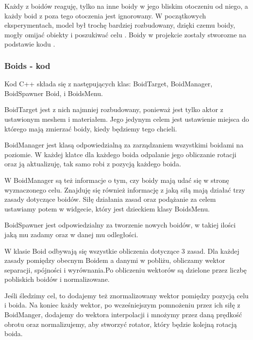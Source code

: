 \documentclass[a4paper,12pt,reqno]{article}
\begin{document}
Każdy z boidów reaguję, tylko na inne boidy w jego bliskim otoczeniu od niego, a każdy boid z poza tego otoczenia jest ignorowany. W początkowych eksperymentach, model był trochę bardziej rozbudowany, dzięki czemu boidy, mogły omijać obiekty i poszukiwać celu \cite{boids_reynolds}. Boidy w projekcie zostały stworozne na podstawie kodu \cite{code_boids}.

\subsubsection{Boids - kod}

Kod C++ składa się z następujących klas: BoidTarget, BoidManager, BoidSpawner Boid,  i BoidsMenu. 

BoidTarget jest z nich najmniej rozbudowany, ponieważ jest tylko aktor z ustawionym meshem i materiałem. Jego jedynym celem jest ustawienie miejsca do którego mają zmierzać boidy, kiedy będziemy tego chcieli.

BoidManager jest klasą odpowiedzialną za zarządzaniem wszystkimi boidami na poziomie. W każdej klatce dla każdego boida odpalanie jego obliczanie rotacji oraz ją aktualizuję, tak samo robi z pozycją każdego boida.



W BoidManager są też informacje o tym, czy boidy mają udać się w stronę wyznaczonego celu. Znajduję się również informację z jaką siłą mają działać trzy zasady dotyczące boidów. Siłę działania zasad oraz podążanie za celem ustawiamy potem w widgecie, który jest dzieckiem klasy BoidsMenu.

BoidSpawner jest odpowiedzialny za tworzenie nowych boidów, w takiej ilości jaką mu zadamy oraz w danej mu odległości.

W klasie Boid odbywają się wszystkie obliczenia dotyczące 3 zasad. Dla każdej zasady pomiędzy obecnym Boidem a danymi w pobliżu, obliczamy wektor separacji, spójności i wyrównania.Po obliczeniu wektorów są dzielone przez liczbę pobliskich boidów i normalizowane.



Jeśli śledzimy cel, to dodajemy też znormalizowany wektor pomiędzy pozycją celu i boida. Na koniec każdy wektor, po wcześniejszym pomnożeniu przez ich siłę z BoidManger, dodajemy do wektora interpolacji i mnożymy przez daną prędkość obrotu oraz normalizujemy, aby stworzyć rotator, który będzie kolejną rotacją boida.
\end{document}
